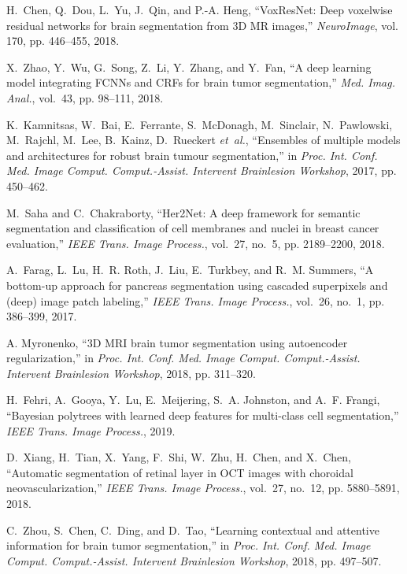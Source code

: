 \documentclass[journal,twoside]{IEEEtran}
\begin{document}
\begin{thebibliography}{55}
H.~Chen, Q.~Dou, L.~Yu, J.~Qin, and P.-A. Heng, ``VoxResNet: Deep voxelwise residual networks for brain segmentation from 3D MR images,'' \emph{NeuroImage}, vol. 170, pp. 446--455, 2018.

X.~Zhao, Y.~Wu, G.~Song, Z.~Li, Y.~Zhang, and Y.~Fan, ``A deep learning model integrating {FCNNs} and {CRFs} for brain tumor segmentation,'' \emph{Med. Imag. Anal.}, vol.~43, pp. 98--111, 2018.

K.~Kamnitsas, W.~Bai, E.~Ferrante, S.~McDonagh, M.~Sinclair, N.~Pawlowski, M.~Rajchl, M.~Lee, B.~Kainz, D.~Rueckert \emph{et~al.}, ``Ensembles of multiple models and architectures for robust brain tumour segmentation,'' in \emph{Proc. Int. Conf. Med. Image Comput. Comput.-Assist. Intervent Brainlesion Workshop}, 2017, pp. 450--462.

M.~Saha and C.~Chakraborty, ``Her2Net: A deep framework for semantic segmentation and classification of cell membranes and nuclei in breast cancer evaluation,'' \emph{IEEE Trans. Image Process.}, vol.~27, no.~5, pp. 2189--2200, 2018.

A.~Farag, L.~Lu, H.~R. Roth, J.~Liu, E.~Turkbey, and R.~M. Summers, ``A bottom-up approach for pancreas segmentation using cascaded superpixels and (deep) image patch labeling,'' \emph{IEEE Trans. Image Process.}, vol.~26, no.~1, pp. 386--399, 2017.

A. Myronenko, ``3D MRI brain tumor segmentation using autoencoder regularization,'' in \emph{Proc. Int. Conf. Med. Image Comput. Comput.-Assist. Intervent Brainlesion Workshop}, 2018, pp. 311--320.

H.~Fehri, A.~Gooya, Y.~Lu, E.~Meijering, S.~A. Johnston, and A.~F. Frangi, ``Bayesian polytrees with learned deep features for multi-class cell segmentation,'' \emph{IEEE Trans. Image Process.}, 2019.


D.~Xiang, H.~Tian, X.~Yang, F.~Shi, W.~Zhu, H.~Chen, and X.~Chen, ``Automatic segmentation of retinal layer in OCT images with choroidal neovascularization,'' \emph{IEEE Trans. Image Process.}, vol.~27, no.~12, pp. 5880--5891, 2018.

C.~Zhou, S.~Chen, C.~Ding, and D.~Tao, ``Learning contextual and attentive information for brain tumor segmentation,'' in \emph{Proc. Int. Conf. Med. Image Comput. Comput.-Assist. Intervent Brainlesion Workshop}, 2018, pp. 497--507.


\end{thebibliography}
\end{document}
